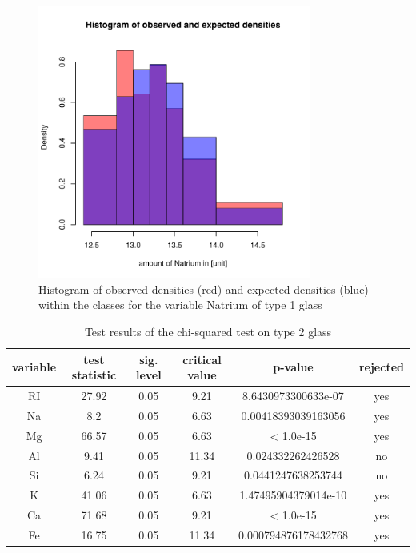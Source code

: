 \documentclass[a4paper, 12pt, titlepage, headsepline, listof = totoc, bibliography = totoc, numbers = noenddot]{scrartcl}
\begin{document}
\begin{figure}[h!]
\centering
\includegraphics[width=0.8\textwidth]{report-chisqType1Na}
\caption{Histogram of observed densities (red) and expected densities (blue) within the classes for the variable Natrium of type 1 glass}
\label{fig:chisqType1Na}
\end{figure}

\begin{table}[h!]
\centering
\begin{tabular}{|cccccc|} \hline variable & test statistic & sig. level & critical value & p-value & rejected\\ \hline RI & 27.92 & 0.05 & 9.21 & 8.6430973300633e-07 & yes\\ 
Na & 8.2 & 0.05 & 6.63 & 0.00418393039163056 & yes\\ 
Mg & 66.57 & 0.05 & 6.63 & < 1.0e-15 & yes\\ 
Al & 9.41 & 0.05 & 11.34 & 0.024332262426528 & no\\ 
Si & 6.24 & 0.05 & 9.21 & 0.0441247638253744 & no\\ 
K & 41.06 & 0.05 & 6.63 & 1.47495904379014e-10 & yes\\ 
Ca & 71.68 & 0.05 & 9.21 & < 1.0e-15 & yes\\ 
Fe & 16.75 & 0.05 & 11.34 & 0.000794876178432768 & yes\\ \hline \end{tabular}\caption{Test results of the chi-squared test on type 2 glass}
\label{tab:chi-type2}
\end{table}
\end{document}
